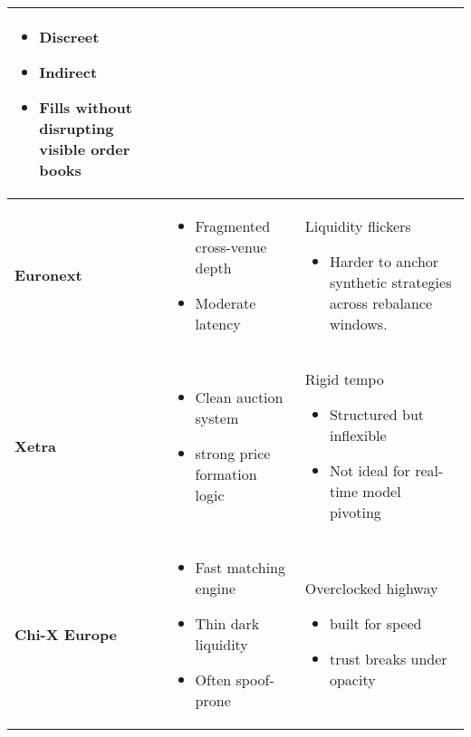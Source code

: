 \begin{table}[H]
\begin{tabularx}{\textwidth}{|l|X|X|}
            \begin{itemize}
                \item Discreet 
                \item Indirect 
                \item Fills without disrupting visible order books 
            \end{itemize}
        \\
    \hline
    \textbf{Euronext} 
        & 
            \begin{itemize}
                \item Fragmented cross-venue depth 
                \item Moderate latency
            \end{itemize}
        & 
            Liquidity flickers
            \begin{itemize}
                \item Harder to anchor synthetic strategies across rebalance windows. 
            \end{itemize}
        \\
    \hline
    \textbf{Xetra} 
        & 
            \begin{itemize}
                \item Clean auction system
                \item strong price formation logic 
            \end{itemize}
        & 
            Rigid tempo
            \begin{itemize}
                \item Structured but inflexible
                \item Not ideal for real-time model pivoting
            \end{itemize}
        \\
    \hline
    \textbf{Chi-X Europe} 
        & 
            \begin{itemize}
                \item Fast matching engine 
                \item Thin dark liquidity
                \item Often spoof-prone 
            \end{itemize}
        & 
            Overclocked highway 
            \begin{itemize}
                \item built for speed
                \item trust breaks under opacity

\end{itemize}
\end{tabularx}
\end{table}
